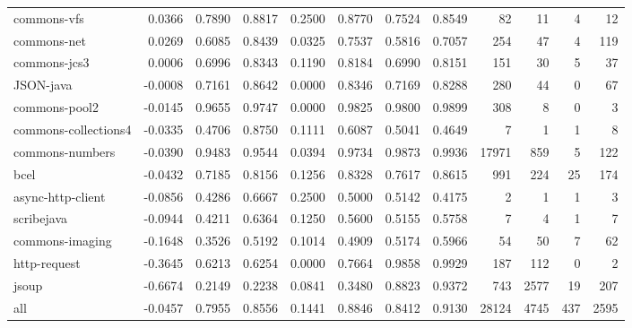 \begin{table*}
\begin{tabular}{lrrrrrrrrrrr}
            commons-vfs &      0.0366 &  0.7890 &     0.8817 &     0.2500 &  0.8770 &     0.7524 &   0.8549 &     82 &    11 &    4 &    12 \\
            commons-net &      0.0269 &  0.6085 &     0.8439 &     0.0325 &  0.7537 &     0.5816 &   0.7057 &    254 &    47 &    4 &   119 \\
           commons-jcs3 &      0.0006 &  0.6996 &     0.8343 &     0.1190 &  0.8184 &     0.6990 &   0.8151 &    151 &    30 &    5 &    37 \\
              JSON-java &     -0.0008 &  0.7161 &     0.8642 &     0.0000 &  0.8346 &     0.7169 &   0.8288 &    280 &    44 &    0 &    67 \\
          commons-pool2 &     -0.0145 &  0.9655 &     0.9747 &     0.0000 &  0.9825 &     0.9800 &   0.9899 &    308 &     8 &    0 &     3 \\
   commons-collections4 &     -0.0335 &  0.4706 &     0.8750 &     0.1111 &  0.6087 &     0.5041 &   0.4649 &      7 &     1 &    1 &     8 \\
        commons-numbers &     -0.0390 &  0.9483 &     0.9544 &     0.0394 &  0.9734 &     0.9873 &   0.9936 &  17971 &   859 &    5 &   122 \\
                   bcel &     -0.0432 &  0.7185 &     0.8156 &     0.1256 &  0.8328 &     0.7617 &   0.8615 &    991 &   224 &   25 &   174 \\
      async-http-client &     -0.0856 &  0.4286 &     0.6667 &     0.2500 &  0.5000 &     0.5142 &   0.4175 &      2 &     1 &    1 &     3 \\
             scribejava &     -0.0944 &  0.4211 &     0.6364 &     0.1250 &  0.5600 &     0.5155 &   0.5758 &      7 &     4 &    1 &     7 \\
        commons-imaging &     -0.1648 &  0.3526 &     0.5192 &     0.1014 &  0.4909 &     0.5174 &   0.5966 &     54 &    50 &    7 &    62 \\
           http-request &     -0.3645 &  0.6213 &     0.6254 &     0.0000 &  0.7664 &     0.9858 &   0.9929 &    187 &   112 &    0 &     2 \\
                  jsoup &     -0.6674 &  0.2149 &     0.2238 &     0.0841 &  0.3480 &     0.8823 &   0.9372 &    743 &  2577 &   19 &   207 \\
                    all &     -0.0457 &  0.7955 &     0.8556 &     0.1441 &  0.8846 &     0.8412 &   0.9130 &  28124 &  4745 &  437 &  2595 \\
\bottomrule
\end{tabular}
\end{table*}
